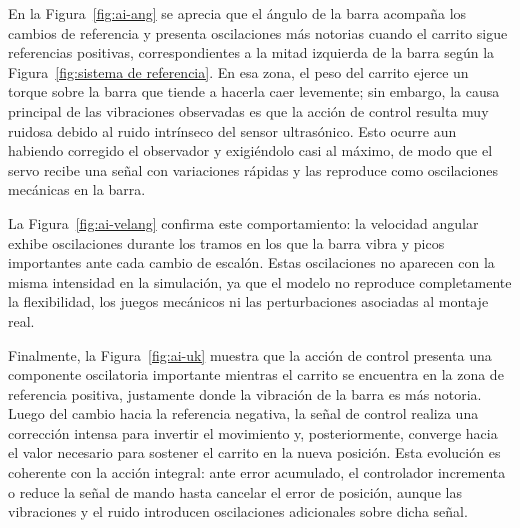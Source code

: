 En la Figura~\ref{fig:ai-ang} se aprecia que el ángulo de la barra acompaña los cambios de referencia y presenta oscilaciones más notorias cuando el carrito sigue referencias positivas, correspondientes a la mitad izquierda de la barra según la Figura~\ref{fig:sistema de referencia}. En esa zona, el peso del carrito ejerce un torque sobre la barra que tiende a hacerla caer levemente; sin embargo, la causa principal de las vibraciones observadas es que la acción de control resulta muy ruidosa debido al ruido intrínseco del sensor ultrasónico. Esto ocurre aun habiendo corregido el observador y exigiéndolo casi al máximo, de modo que el servo recibe una señal con variaciones rápidas y las reproduce como oscilaciones mecánicas en la barra.

La Figura~\ref{fig:ai-velang} confirma este comportamiento: la velocidad angular exhibe oscilaciones durante los tramos en los que la barra vibra y picos importantes ante cada cambio de escalón. Estas oscilaciones no aparecen con la misma intensidad en la simulación, ya que el modelo no reproduce completamente la flexibilidad, los juegos mecánicos ni las perturbaciones asociadas al montaje real.

Finalmente, la Figura~\ref{fig:ai-uk} muestra que la acción de control presenta una componente oscilatoria importante mientras el carrito se encuentra en la zona de referencia positiva, justamente donde la vibración de la barra es más notoria. Luego del cambio hacia la referencia negativa, la señal de control realiza una corrección intensa para invertir el movimiento y, posteriormente, converge hacia el valor necesario para sostener el carrito en la nueva posición. Esta evolución es coherente con la acción integral: ante error acumulado, el controlador incrementa o reduce la señal de mando hasta cancelar el error de posición, aunque las vibraciones y el ruido introducen oscilaciones adicionales sobre dicha señal.

